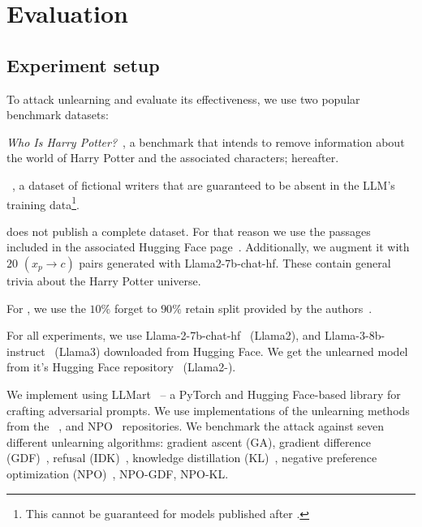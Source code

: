 \section{Evaluation}\label{sec:eval}

\subsection{Experiment setup}

To attack unlearning and evaluate its effectiveness, we use two popular benchmark datasets:
\begin{enumerate*}[label=\arabic*)]
    \item \textit{Who Is Harry Potter?}~\cite{eldan2023harrypotter}, a benchmark that intends to remove information about the world of Harry Potter and the associated characters; \whp hereafter.
    \item \tofu~\cite{maini2024tofu}, a dataset of fictional writers that are guaranteed to be absent in the LLM's training data\footnote{This cannot be guaranteed for models published after \tofu.}.
\end{enumerate*}

\whp does not publish a complete dataset.
For that reason we use the passages included in the associated Hugging Face page~\cite{eldan2023harrypotter-hf}.
Additionally, we augment it with $20$ $(x_p\rightarrow c)$ pairs generated with Llama2-7b-chat-hf.
These contain general trivia about the Harry Potter universe.

For \tofu, we use the $10\%$ forget to $90\%$ retain split provided by the authors~\cite{tofuhf}.

For all experiments, we use Llama-2-7b-chat-hf~\cite{touvron2023llama} (Llama2), and Llama-3-8b-instruct~\cite{meta2024llama} (Llama3) downloaded from Hugging Face.
We get the unlearned \whp model from it's Hugging Face repository~\cite{eldan2023harrypotter-hf} (Llama2-\whp).

We implement \sta using LLMart~\cite{llmart2025github} -- a PyTorch and Hugging Face-based library for crafting adversarial prompts. 
We use implementations of the unlearning methods from the \tofu~\cite{tofugithub}, and NPO~\cite{npogithub} repositories.
We benchmark the attack against seven different unlearning algorithms: gradient ascent (GA), gradient difference (GDF)~\cite{liu2022continual}, refusal (IDK)~\cite{rafailov2024direct}, knowledge distillation (KL)~\cite{hinton2015distilling}, negative preference optimization (NPO)~\cite{zhang2024negative}, NPO-GDF, NPO-KL.

